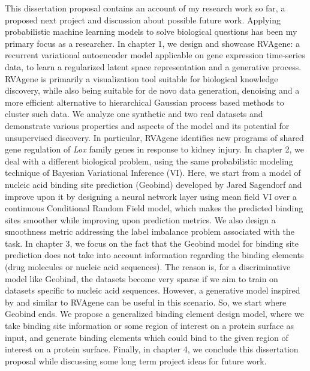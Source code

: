 This dissertation proposal contains an account of my research work so far, a proposed next project and discussion about possible future work.
Applying probabilistic machine learning models to solve biological questions has been my primary focus as a researcher. 
In chapter 1, we design and showcase RVAgene: a recurrent variational
autoencoder model applicable on gene expression time-series data, to learn a regularized latent
space representation and a generative process. RVAgene is primarily a visualization tool suitable for biological 
knowledge discovery, while also being suitable for de novo data generation, denoising and a more
efficient alternative to hierarchical Gaussian process based methods to cluster such data. We
analyze one synthetic and two real datasets and demonstrate various properties and aspects of the
model and its potential for unsupervised discovery.  In particular, RVAgene identifies new programs of 
shared gene regulation of \textit{Lox} family genes in response to kidney injury. In
chapter 2, we deal with a different biological problem, using the same probabilistic modeling
technique of Bayesian Variational Inference (VI). Here, we start from a model of nucleic acid binding site
prediction (Geobind) developed by Jared Sagendorf and improve upon it by designing a neural network layer using mean field
VI over a continuous Conditional Random Field model, which makes the predicted binding sites
smoother while improving upon prediction metrics. We also design a smoothness metric
addressing the label imbalance problem associated with the task. In chapter 3, we focus on the fact that the Geobind
model for binding site prediction does not take into account information regarding the binding
elements (drug molecules or nucleic acid sequences). The reason is, for a discriminative model like
Geobind, the datasets become very sparse if we aim to train on datasets specific to nucleic acid
sequences. However, a generative model inspired by and similar to RVAgene can be useful in this
scenario. So, we start where Geobind ends. We propose a generalized binding element design model, where we take binding site
information or some region of interest on a protein surface as input, and generate binding elements which
could bind to the given region of interest on a protein surface. Finally, in chapter 4, we conclude
this dissertation proposal while discussing some long term project ideas for future work.
